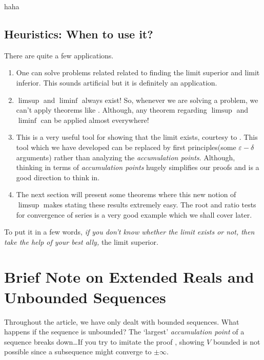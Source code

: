 \documentclass[parskip=half, numbers=endperiod, 11pt]{scrartcl}
\begin{document}
\begin{theorem}
	haha
\end{theorem}


\subsection{Heuristics: When to use it?}

There are quite a few applications.

\begin{enumerate}
	\item One can solve problems related related to
	      finding the limit superior and limit inferior.
	      This sounds artificial but it is definitely
	      an application.

	\item $\limsup$ and $\liminf$ always exist! So,
	      whenever we are solving a problem, we
	      can't apply theorems like .
	      Although, any theorem regarding $\limsup$
	      and $\liminf$ can be applied almost everywhere!

	\item This is a very useful tool for showing that
	      the limit exists, courtesy to
	      . This tool
	      which we have developed can be replaced by
	      first principles(some $\varepsilon-\delta$
	      arguments) rather than analyzing the
	      \emph{accumulation points}. Although, thinking
	      in terms of \emph{accumulation points} hugely
	      simplifies our proofs and is a good direction
	      to think in.

	\item The next section will present some theorems
	      where this new notion of $\limsup$ makes
	      stating these results extremely easy. The root
	      and ratio tests for convergence of series is a
	      very good example which we shall cover later.
\end{enumerate}

To put it in a few words, \emph{if you don't know whether
	the limit exists or not, then take the help of your
	best ally,} the limit superior.

\newpage

\section{Brief Note on Extended Reals and Unbounded Sequences}
Throughout the article, we have only dealt with
bounded sequences. What happens if the sequence is
unbounded? The `largest' \emph{accumulation point} of a
sequence breaks down\dots If you try to imitate the proof
, showing $V$
bounded is not possible since a subsequence might
converge to $\pm\infty$.
\end{document}
